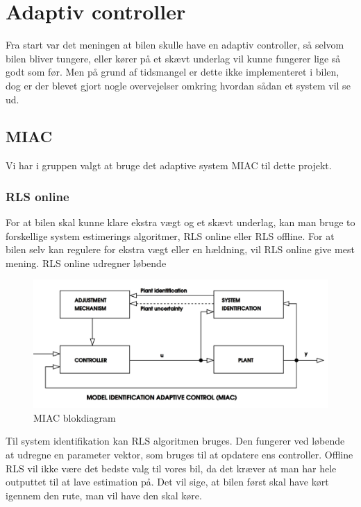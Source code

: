 \graphicspath{{Chapters/Overvejelser_for_udvidelser/}}

\section{Adaptiv controller}
Fra start var det meningen at bilen skulle have en adaptiv controller, så selvom bilen bliver tungere, eller kører på et skævt underlag vil kunne fungerer lige så godt som før. Men på grund af tidsmangel er dette ikke implementeret i bilen, dog er der blevet gjort nogle overvejelser omkring hvordan sådan et system vil se ud. 

\subsection{MIAC}
Vi har i gruppen valgt at bruge det adaptive system MIAC til dette projekt.


\subsubsection{RLS online}
For at bilen skal kunne klare ekstra vægt og et skævt underlag, kan man bruge to forskellige system estimerings algoritmer, RLS online eller RLS offline. For at bilen selv kan regulere for ekstra vægt eller en hældning, vil RLS online give mest mening. RLS online udregner løbende 
 
\begin{figure}[H]
	\centering
	\includegraphics[width = 400pt]{Img/MIAC.png}
	\caption{MIAC blokdiagram}
	\label{fig:MIAC}
\end{figure}

Til system identifikation kan RLS algoritmen bruges. Den fungerer ved løbende at udregne en parameter vektor, som bruges til at opdatere ens controller. Offline RLS vil ikke være det bedste valg til vores bil, da det kræver at man har hele outputtet til at lave estimation på. Det vil sige, at bilen først skal have kørt igennem den rute, man vil have den skal køre.


